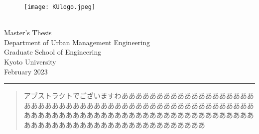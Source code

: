 \documentclass[11truept,a4paper,uplatex,onecolumn,dvipdfmx]{jsreport}
\begin{document}


\begin{titlepage}
    \vspace{15mm}
    \begin{wrapfigure}{r}{0.45\linewidth}  %
        \centering
        \vspace{5mm}\hspace{25mm}
        \texttt{[image: KUlogo.jpeg]}
    \end{wrapfigure}
    \leavevmode
    \par
    {
    \fontsize{12truept}{12truept}\selectfont
    \\
    Master's Thesis\\
    Department of Urban Management Engineering\\
    Graduate School of Engineering\\
    Kyoto University\\
    February 2023\\
    }
    \hrule
    \vspace{25mm}
    {
    \fontsize{16truept}{36truept}\selectfont
    }
\end{titlepage}


\begin{abstract}
    アブストラクトでございますわあああああああああああああああああああああああああああああああああああああああああああああああああああああああああああああああああああああああああああああああああああああああああああああああああああああああああああああああ
\end{abstract}
\end{document}
